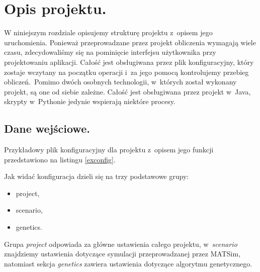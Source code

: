 \documentclass[twoside,12pt]{report}
\let\oldsection\chapter
\def\chapter{\cleardoublepage\oldsection}
\begin{document}
\chapter{Opis projektu.}\label{rozdz.opis} 

W niniejszym rozdziale opisujemy strukturę projektu z~opisem jego uruchomienia. Ponieważ przeprowadzane przez projekt obliczenia wymagają wiele czasu, zdecydowaliśmy się na pominięcie interfejsu użytkownika przy projektowaniu aplikacji. Całość jest obsługiwana przez plik konfiguracyjny, który zostaje wczytany na początku operacji i~za jego pomocą kontrolujemy przebieg obliczeń.~Pomimo dwóch osobnych technologii, w~których został wykonany projekt, są one od siebie zależne. Całość jest obsługiwana przez projekt w~Java, skrypty w~Pythonie jedynie wspierają niektóre procesy.

\section{Dane wejściowe.}

Przykładowy plik konfiguracyjny dla projektu z~opisem jego funkcji przedstawiono na listingu \ref{exconfig}.

 

\vspace*{15px}

Jak widać konfiguracja dzieli się na trzy podstawowe grupy:
\begin{itemize}
\item project,
\item scenario,
\item genetics.
\end{itemize}

\vspace*{15px}

Grupa \textit{project} odpowiada za główne ustawienia całego projektu, w~\textit{scenario} znajdziemy ustawienia dotyczące symulacji przeprowadzanej przez MATSim, natomiast sekcja \textit{genetics} zawiera ustawienia dotyczące algorytmu genetycznego.

\vspace*{15px}
\end{document}
